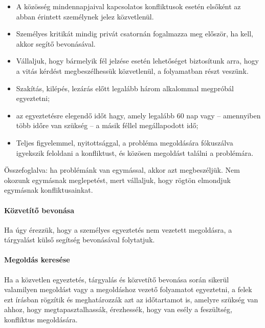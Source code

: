 \begin{itemize}

  \item
        A közösség mindennapjaival kapcsolatos konfliktusok esetén elsőként az
        abban érintett személynek jelez közvetlenül.\\
  \item
        Személyes kritikát mindig privát csatornán fogalmazza meg először, ha
        kell, akkor segítő bevonásával.
  \item
        Vállaljuk, hogy bármelyik fél jelzése esetén lehetőséget biztosítunk
        arra, hogy a vitás kérdést megbeszélhessük közvetlenül, a folyamatban
        részt veszünk.
  \item
        Szakítás, kilépés, lezárás előtt legalább három alkalommal megpróbál
        egyeztetni;
  \item
        az egyeztetésre elegendő időt hagy, amely legalább 60 nap vagy --
        amennyiben több időre van szükség -- a másik féllel megállapodott idő;
  \item
        Teljes figyelemmel, nyitottsággal, a probléma megoldására fókuszálva
        igyekszik feloldani a konfliktust, és közösen megoldást találni a
        problémára.
\end{itemize}

Összefoglalva: ha problémánk van egymással, akkor azt megbeszéljük. Nem
okozunk egymásnak meglepetést, mert vállaljuk, hogy rögtön elmondjuk
egymásnak konfliktusainkat.

\paragraph{Közvetítő bevonása}\label{kuxf6zvetuxedtux151-bevonuxe1sa}

Ha úgy érezzük, hogy a személyes egyeztetés nem vezetett megoldásra, a
tárgyalást külső segítség bevonásával folytatjuk.

\paragraph{Megoldás keresése}\label{megolduxe1s-keresuxe9se}

Ha a közvetlen egyeztetés, tárgyalás és közvetítő bevonása során sikerül
valamilyen megoldást vagy a megoldáshoz vezető folyamatot egyeztetni, a
felek ezt írásban rögzítik és meghatározzák azt az időtartamot is,
amelyre szükség van ahhoz, hogy megtapasztalhassák, érezhessék, hogy van
esély a feszültség, konfliktus megoldására.

